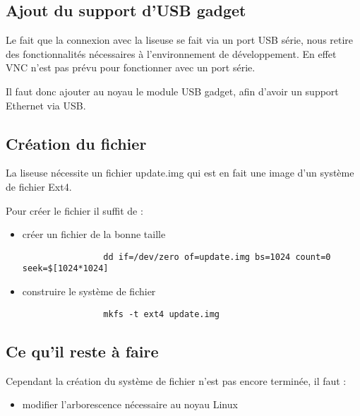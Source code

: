  \subsection{Ajout du support d'USB gadget}
 
 Le fait que la connexion avec la liseuse se fait via un port USB série, nous retire des fonctionnalités nécessaires à l'environnement de développement. En effet VNC n'est pas prévu pour fonctionner avec un port série.
 
 Il faut donc ajouter au noyau le module USB gadget, afin d'avoir un support Ethernet via USB.

\subsection{Création du fichier}

La liseuse nécessite un fichier update.img qui est en fait une image d'un système de fichier Ext4.

Pour créer le fichier il suffit de : 
	\begin{itemize}
		\item créer un fichier de la bonne taille \\
			\begin{verbatim}
				dd if=/dev/zero of=update.img bs=1024 count=0 seek=$[1024*1024]
			\end{verbatim}
		\item construire le système de fichier \\
			\begin{verbatim}
				mkfs -t ext4 update.img
			\end{verbatim}
	\end{itemize}

\subsection{Ce qu'il reste à faire}

Cependant la création du système de fichier n'est pas encore terminée, il faut :
	\begin{itemize}
		\item modifier l'arborescence nécessaire au noyau Linux
	\end{itemize}